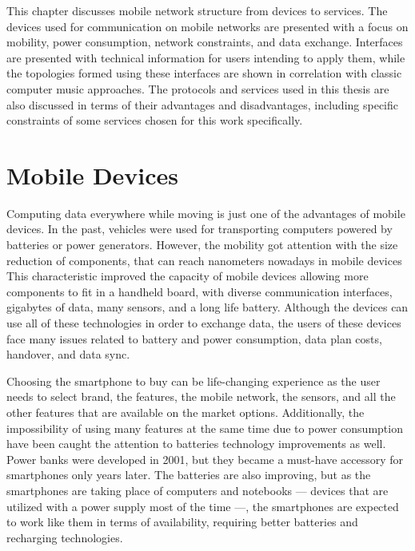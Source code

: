 This chapter discusses mobile network structure from devices to services.
The devices used for communication on mobile networks are presented with a focus on mobility, power consumption, network constraints, and data exchange.
Interfaces are presented with technical information for users intending to apply them, while the topologies formed using these interfaces are shown in correlation with classic computer music approaches.
The protocols and services used in this thesis are also discussed in terms of their advantages and disadvantages, including specific constraints of some services chosen for this work specifically.

\section{Mobile Devices}
\label{sec:mobiledevices}

Computing data everywhere while moving is just one of the advantages of mobile devices.
In the past, vehicles were used for transporting computers powered by batteries or power generators.
However, the mobility got attention with the size reduction of components, that can reach nanometers nowadays in mobile devices
This characteristic improved the capacity of mobile devices allowing more components to fit in a handheld board, with diverse communication interfaces, gigabytes of data, many sensors, and a long life battery.
Although the devices can use all of these technologies in order to exchange data, the users of these devices face many issues related to battery and power consumption, data plan costs, handover, and data sync.

Choosing the smartphone to buy can be life-changing experience as the user needs to select brand, the features, the mobile network, the sensors, and all the other features that are available on the market options.
Additionally, the impossibility of using many features at the same time due to power consumption have been caught the attention to  batteries technology improvements as well.
Power banks were developed in 2001, but they became a must-have accessory for smartphones only years later.
The batteries are also improving, but as the smartphones are taking place of computers and notebooks --- devices that are utilized with a power supply most of the time ---, the smartphones are expected to work like them in terms of availability, requiring better batteries and recharging technologies.

